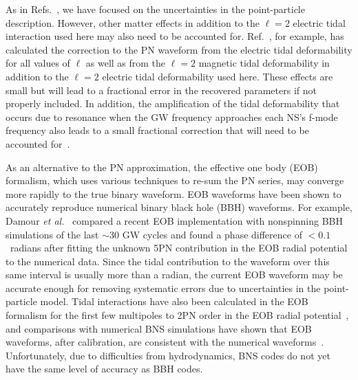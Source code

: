 \documentclass[twocolumn,prd,amssymb,aps,nofootinbib,showpacs,epsf]{revtex4}
\begin{document}
As in Refs.~\cite{Favata2014, YagiYunes2014, WadeCreightonOchsner2014}, we have focused on the uncertainties in the point-particle description. However, other matter effects in addition to the $\ell=2$ electric tidal interaction used here may also need to be accounted for. Ref.~\cite{Yagi2014}, for example, has calculated the correction to the PN waveform from the electric tidal deformability for all values of $\ell$ as well as from the $\ell=2$ magnetic tidal deformability in addition to the $\ell=2$ electric tidal deformability used here. These effects are small but will lead to a fractional error in the recovered parameters if not properly included. In addition, the amplification of the tidal deformability that occurs due to resonance when the GW frequency approaches each NS's f-mode frequency also leads to a small fractional correction that will need to be accounted for~\cite{FlanaganHinderer2008}. 

As an alternative to the PN approximation, the effective one body (EOB) formalism, which uses various techniques to re-sum the PN series, may converge more rapidly to the true binary waveform. EOB waveforms have been shown to accurately reproduce numerical binary black hole (BBH) waveforms. For example, Damour {\it et al.}~\cite{DamourNagarBernuzzi2013} compared a recent EOB implementation with nonspinning BBH simulations of the last $\sim 30$ GW cycles and found a phase difference of $<0.1$~radians after fitting the unknown 5PN contribution in the EOB radial potential to the numerical data. Since the tidal contribution to the waveform over this same interval is usually more than a radian, the current EOB waveform may be accurate enough for removing systematic errors due to uncertainties in the point-particle model. Tidal interactions have also been calculated in the EOB formalism for the first few multipoles to 2PN order in the EOB radial potential~\cite{BiniDamourFaye2012}, and comparisons with numerical BNS simulations have shown that EOB waveforms, after calibration, are consistent with the numerical waveforms~\cite{BernuzziNagarThierfelder2012, HotokazakaKyutokuShibata2013}. Unfortunately, due to difficulties from hydrodynamics, BNS codes do not yet have the same level of accuracy as BBH codes.

\end{document}
